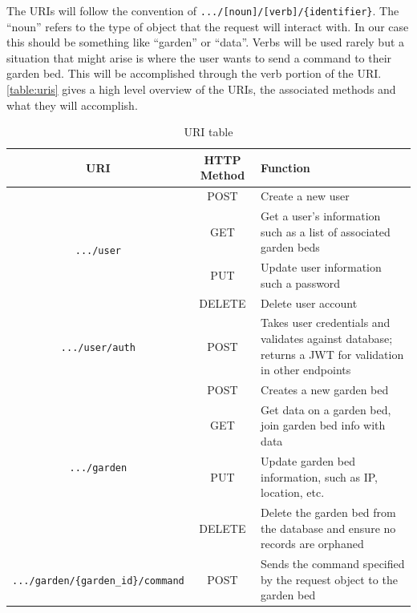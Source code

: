 The URIs will follow the convention of \verb|.../[noun]/[verb]/{identifier}|. The ``noun'' refers to the type of object that the request will interact with. In our case this should be something like ``garden'' or ``data''. Verbs will be used rarely but a situation that might arise is where the user wants to send a command to their garden bed. This will be accomplished through the verb portion of the URI. \autoref{table:uris} gives a high level overview of the URIs, the associated methods and what they will accomplish.
\begin{table}[h]
    \centering
    \begin{tabular}{c|c|p{6cm}}
        \hline
        \textbf{URI} & \textbf{HTTP Method} & \textbf{Function} \\
        \hline
        \multirow{4}{*}{\texttt{.../user}} & POST & Create a new user \\\cline{2-3}
                                           & GET & Get a user's information such as a list of associated garden beds\\\cline{2-3}
                                           & PUT & Update user information such a password \\\cline{2-3}
                                           & DELETE & Delete user account \\\hline
        \texttt{.../user/auth} & POST & Takes user credentials and validates against database; returns a JWT for validation in other endpoints \\
        \hline
        \multirow{4}{*}{\texttt{.../garden}} & POST & Creates a new garden bed \\\cline{2-3}
                          & GET & Get data on a garden bed, join garden bed info with data  \\\cline{2-3}
                          & PUT & Update garden bed information, such as IP, location, etc. \\\cline{2-3}
                          & DELETE & Delete the garden bed from the database and ensure no records are orphaned \\\hline
        \texttt{.../garden/\{garden\_id\}/command} & POST & Sends the command specified by the request object to the garden bed \\
        \hline
    \end{tabular}
    \caption{URI table}
    \label{table:uris}
\end{table}

